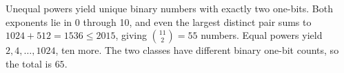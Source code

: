 Unequal powers yield unique binary numbers with exactly two one-bits. Both exponents lie in 0 through 10, and even the largest distinct pair sums to $ 1024+512=1536\le2015 $, giving $\binom{11}{2}=55 $ numbers. Equal powers yield $ 2,4,\ldots,1024 $, ten more. The two classes have different binary one-bit counts, so the total is $\boxed{65}$.
